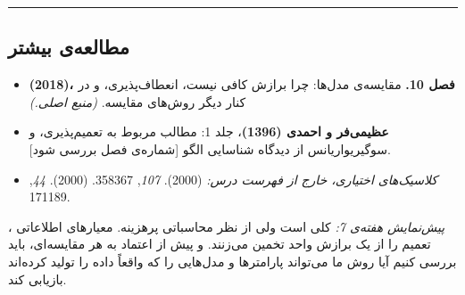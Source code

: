 \begin{center}\rule{0.5\linewidth}{0.5pt}\end{center}

\subsection{مطالعه‌ی بیشتر}

\begin{itemize}
\tightlist
\item
  \textbf{ \lr{\&}  (2018)، فصل 10.} مقایسه‌ی
  مدل‌ها: چرا برازش کافی نیست، انعطاف‌پذیری، و  در
  کنار دیگر روش‌های مقایسه. \emph{(منبع اصلی.)}
\item
  \textbf{عظیمی‌فر و احمدی (1396)}، جلد 1: مطالب مربوط به تعمیم‌پذیری،
   و  سوگیری\lr{--}واریانس از دیدگاه شناسایی
  الگو {[}شماره‌ی فصل بررسی شود{]}.
\item
  \emph{کلاسیک‌های اختیاری، خارج از فهرست درس:}  \lr{\&}
   (2000).  \emph{ 107}, 358\lr{--}367.
   \lr{\&}  (2000).  \emph{ 44},
  171\lr{--}189.
\end{itemize}

\emph{پیش‌نمایش هفته‌ی 7:}  کلی است ولی از نظر
محاسباتی پرهزینه. معیارهای اطلاعاتی ،  تعمیم را از یک
برازش واحد تخمین می‌زنند. و پیش از اعتماد به هر مقایسه‌ای، باید بررسی کنیم
آیا روش ما می‌تواند پارامترها و مدل‌هایی را که واقعاً داده را تولید کرده‌اند
بازیابی کند.
